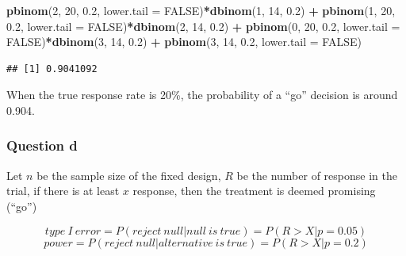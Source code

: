 \documentclass[]{article}
\newenvironment{Shaded}{\begin{snugshade}}{\end{snugshade}}
\newcommand{\DataTypeTok}[1]{\textcolor[rgb]{0.13,0.29,0.53}{#1}}
\newcommand{\DecValTok}[1]{\textcolor[rgb]{0.00,0.00,0.81}{#1}}
\newcommand{\FloatTok}[1]{\textcolor[rgb]{0.00,0.00,0.81}{#1}}
\newcommand{\KeywordTok}[1]{\textcolor[rgb]{0.13,0.29,0.53}{\textbf{#1}}}
\newcommand{\NormalTok}[1]{#1}
\newcommand{\OperatorTok}[1]{\textcolor[rgb]{0.81,0.36,0.00}{\textbf{#1}}}
\newcommand{\OtherTok}[1]{\textcolor[rgb]{0.56,0.35,0.01}{#1}}
\newcommand{\StringTok}[1]{\textcolor[rgb]{0.31,0.60,0.02}{#1}}
\begin{document}
\begin{Shaded}
\begin{Highlighting}[]
\KeywordTok{pbinom}\NormalTok{(}\DecValTok{2}\NormalTok{, }\DecValTok{20}\NormalTok{, }\FloatTok{0.2}\NormalTok{, }\DataTypeTok{lower.tail =} \OtherTok{FALSE}\NormalTok{)}\OperatorTok{*}\KeywordTok{dbinom}\NormalTok{(}\DecValTok{1}\NormalTok{, }\DecValTok{14}\NormalTok{, }\FloatTok{0.2}\NormalTok{) }\OperatorTok{+}\StringTok{ }\KeywordTok{pbinom}\NormalTok{(}\DecValTok{1}\NormalTok{, }\DecValTok{20}\NormalTok{, }\FloatTok{0.2}\NormalTok{, }\DataTypeTok{lower.tail =} \OtherTok{FALSE}\NormalTok{)}\OperatorTok{*}\KeywordTok{dbinom}\NormalTok{(}\DecValTok{2}\NormalTok{, }\DecValTok{14}\NormalTok{, }\FloatTok{0.2}\NormalTok{) }\OperatorTok{+}\StringTok{ }\KeywordTok{pbinom}\NormalTok{(}\DecValTok{0}\NormalTok{, }\DecValTok{20}\NormalTok{, }\FloatTok{0.2}\NormalTok{, }\DataTypeTok{lower.tail =} \OtherTok{FALSE}\NormalTok{)}\OperatorTok{*}\KeywordTok{dbinom}\NormalTok{(}\DecValTok{3}\NormalTok{, }\DecValTok{14}\NormalTok{, }\FloatTok{0.2}\NormalTok{) }\OperatorTok{+}\StringTok{ }\KeywordTok{pbinom}\NormalTok{(}\DecValTok{3}\NormalTok{, }\DecValTok{14}\NormalTok{, }\FloatTok{0.2}\NormalTok{, }\DataTypeTok{lower.tail =} \OtherTok{FALSE}\NormalTok{)}
\end{Highlighting}
\end{Shaded}

\begin{verbatim}
## [1] 0.9041092
\end{verbatim}

When the true response rate is 20\%, the probability of a ``go''
decision is around 0.904.

\hypertarget{question-d}{%
\subsubsection{Question d}\label{question-d}}

Let \(n\) be the sample size of the fixed design, \(R\) be the number of
response in the trial, if there is at least \(x\) response, then the
treatment is deemed promising (``go'')

\[type \ I \ error = P(reject \ null|null \ is \ true) = P(R>X|p=0.05)\]
\[power = P(reject \ null|alternative \ is \ true) = P(R>X|p=0.2)\]
\end{document}
